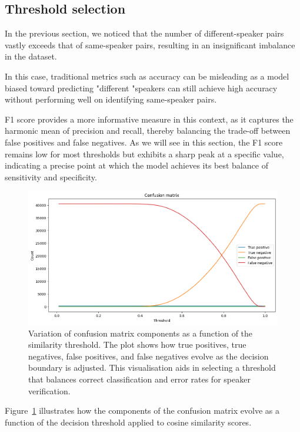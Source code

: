 \documentclass[conference]{IEEEtran}
\begin{document}
	\subsection{Threshold selection}
	
	In the previous section, we noticed that the number of different-speaker pairs vastly exceeds that of same-speaker pairs, resulting in an insignificant imbalance in the dataset.
	
	In this case, traditional metrics such as accuracy can be misleading as a model biased toward predicting "different "speakers can still achieve high accuracy without performing well on identifying same-speaker pairs. 
	
	F1 score provides a more informative measure in this context,  as it captures the harmonic mean of precision and recall, thereby balancing the trade-off between false positives and false negatives. As we will see in this section, the F1 score remains low for most thresholds but exhibits a sharp peak at a specific value, indicating a precise point at which the model achieves its best balance of sensitivity and specificity. 
	
	
	\begin{figure}[H]
		\centering
		\includegraphics[width=1\linewidth]{img/img-confusion-matrix}
		\caption{Variation of confusion matrix components as a function of the similarity threshold. The plot shows how true positives, true negatives, false positives, and false negatives evolve as the decision boundary is adjusted. This visualisation aids in selecting a threshold that balances correct classification and error rates for speaker verification.}
		\label{fig:img-confusion-matrix}
	\end{figure}
	
	
	Figure~\ref{fig:img-confusion-matrix} illustrates how the components of the confusion matrix evolve as a function of the decision threshold applied to cosine similarity scores.
	
\end{document}
